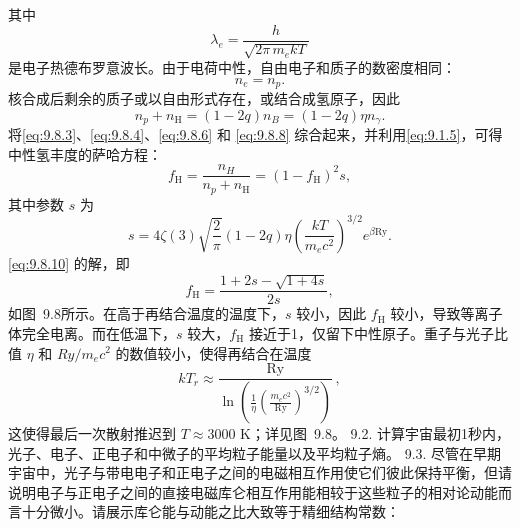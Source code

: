 其中
\begin{equation}\tag{9.8.7}\label{eq:9.8.7}
\lambda _ { e } = \frac { h } { \sqrt { 2 \pi \, m _ { e } k T } }
\end{equation}
是电子热德布罗意波长。由于电荷中性，自由电子和质子的数密度相同：
\begin{equation}\tag{9.8.8}\label{eq:9.8.8}
n _ { e } = n _ { p } .
\end{equation}
核合成后剩余的质子或以自由形式存在，或结合成氢原子，因此
\begin{equation}\tag{9.8.9}\label{eq:9.8.9}
n _ { p } + n _ { \mathrm { H } } = ( 1 - 2 q ) n _ { B } = ( 1 - 2 q ) \eta n _ { \gamma } .
\end{equation}
将\autoref{eq:9.8.3}、\autoref{eq:9.8.4}、\autoref{eq:9.8.6} 和 \autoref{eq:9.8.8} 综合起来，并利用\autoref{eq:9.1.5}，可得中性氢丰度的萨哈方程：
\begin{equation}\tag{9.8.10}\label{eq:9.8.10}
f _ { \mathrm { H } } = \frac { n _ { H } } { n _ { p } + n _ { \mathrm { H } } } = ( 1 - f _ { \mathrm { H } } ) ^{2} s ,
\end{equation}
其中参数 \(s\) 为
\begin{equation}\tag{9.8.11}\label{eq:9.8.11}
s = 4 \zeta ( 3 ) \sqrt { \frac { 2 } { \pi } } ( 1 - 2 q ) \eta \left( \frac { k T } { m _ { e } c ^{2} } \right) ^{3 / 2} e ^{\beta \mathrm { R y} } .
\end{equation}
\autoref{eq:9.8.10} 的解，即
\begin{equation}\tag{9.8.12}\label{eq:9.8.12}
f _ { \mathrm { H } } = \frac { 1 + 2 s - \sqrt { 1 + 4 s } } { 2 s } ,
\end{equation}
如图~9.8所示。在高于再结合温度的温度下，\(s\) 较小，因此 \(f_{\mathrm{H}}\) 较小，导致等离子体完全电离。而在低温下，\(s\) 较大，\(f_{\mathrm{H}}\) 接近于1，仅留下中性原子。重子与光子比值 \(\eta\) 和 \(Ry/m_{e}c^{2}\) 的数值较小，使得再结合在温度
\begin{equation}\tag{9.8.13}\label{eq:9.8.13}
k T _ { r } \approx \frac { \mathrm { R y } } { \ln \left( \frac { 1 } { \eta } \left( \frac { m _ { e } c ^{2} } { \mathrm { R y } } \right) ^{3 / 2} \right) } \, ,
\end{equation}
这使得最后一次散射推迟到 \(T \approx 3000\) K；详见图~9.8。
9.2. 计算宇宙最初1秒内，光子、电子、正电子和中微子的平均粒子能量以及平均粒子熵。
9.3. 尽管在早期宇宙中，光子与带电电子和正电子之间的电磁相互作用使它们彼此保持平衡，但请说明电子与正电子之间的直接电磁库仑相互作用能相较于这些粒子的相对论动能而言十分微小。请展示库仑能与动能之比大致等于精细结构常数：
